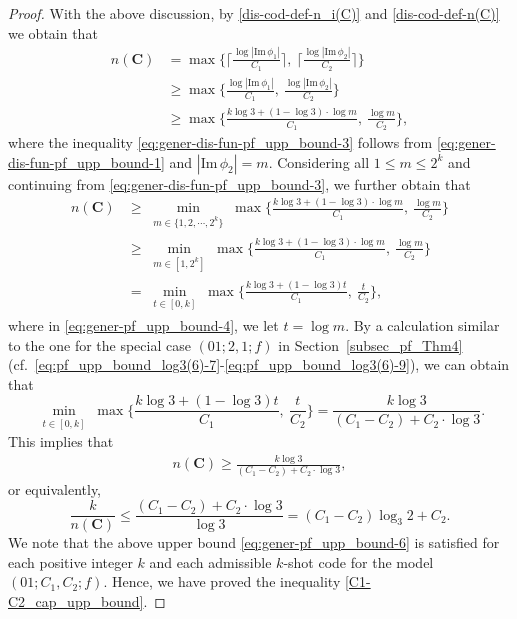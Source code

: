 \documentclass[11pt,draftclsnofoot,onecolumn]{IEEEtran}
\newcommand{\mbC}{\mathbf{C}}
\def\Im{\mathrm{Im}}
\begin{document}
{\begin{proof}
With the above discussion, by  \eqref{dis-cod-def-n_i(C)} and \eqref{dis-cod-def-n(C)} we obtain that
 \begin{align}
n(\mbC)&=\max\bigg\{\bigg\lceil\frac{\log|\Im\,\phi_{1}|}{C_1}\bigg\rceil,~\bigg\lceil\frac{\log|\Im\,\phi_{2}|}{C_2}
\bigg\rceil\bigg\}\nonumber\\
&\geq\max\bigg\{\frac{\log|\Im\,\phi_{1}|}{C_1},~\frac{\log|\Im\,\phi_{2}|}{C_2}
\bigg\}\nonumber\\
&\geq\max\bigg\{\frac{k\log3+(1-\log3)\cdot\log m}{C_1},~\frac{\log m}{C_2}\bigg\},\label{eq:gener-dis-fun-pf_upp_bound-3}
\end{align}
where the inequality \eqref{eq:gener-dis-fun-pf_upp_bound-3} follows from \eqref{eq:gener-dis-fun-pf_upp_bound-1} and $|\Im\,\phi_2|=m$. Considering all $1\leq m\leq 2^k$ and continuing from \eqref{eq:gener-dis-fun-pf_upp_bound-3}, we further obtain that
  \begin{align}
  n(\mbC)&\geq\min_{\substack{m\in\{1,2,\cdots,2^k\}}}\max\bigg\{\frac{k\log3+(1-\log3)\cdot\log m}{C_1},~\frac{\log m}{C_2}\bigg\}\nonumber\\
  &\geq\min_{\substack{m\in[1,2^k]}}\max\bigg\{\frac{k\log3+(1-\log3)\cdot\log m}{C_1},~\frac{\log m}{C_2}\bigg\}\nonumber\\
  &=\min_{\substack{t\in[0,k]}}\max\bigg\{\frac{k\log3+(1-\log3) t}{C_1},~\frac{t}{C_2}\bigg\},\label{eq:gener-pf_upp_bound-4}
  \end{align}
  where in \eqref{eq:gener-pf_upp_bound-4}, we let $t=\log m$.
  By a calculation similar to the one for the special case $(01;2,1;f)$ in Section~\ref{subsec_pf_Thm4} (cf.~\eqref{eq:pf_upp_bound_log3(6)-7}-\eqref{eq:pf_upp_bound_log3(6)-9}), we can obtain that
\begin{equation*}
\min_{\substack{t\in[0,k]}}\max\bigg\{\frac{k\log3+(1-\log3) t}{C_1},~\frac{t}{C_2}\bigg\}=\frac{k\log3}{(C_1-C_2)+C_2\cdot\log 3}.
\label{eq:gener-pf_upp_bound-5}
\end{equation*}
This implies that
\begin{align*}
n(\mbC)\geq\frac{k\log3}{(C_1-C_2)+C_2\cdot\log 3},
\end{align*}
or equivalently,
\begin{equation}
\frac{k}{n(\mbC)}\leq\frac{(C_1-C_2)+C_2\cdot\log 3}{\log3}=(C_1-C_2)\log_{3}2+C_2.\label{eq:gener-pf_upp_bound-6}
\end{equation}
We note that the above upper bound \eqref{eq:gener-pf_upp_bound-6} is satisfied for each positive integer $k$ and each admissible $k$-shot code for the model $(01;C_1,C_2;f)$. Hence, we have proved the inequality \eqref{C1-C2_cap_upp_bound}.




\end{proof}}
\end{document}
